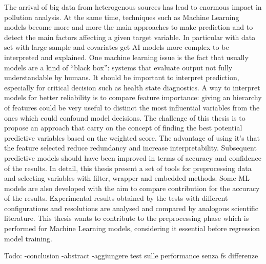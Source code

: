 The arrival of big data from heterogenous sources has lead to enormous impact in pollution analysis.
At the same time, techniques such as Machine Learning models become more and more the main approaches to make prediction and to detect the main factors affecting a given target variable.
In particular with data set with large sample and covariates get AI models more complex to be interpreted and explained.
One machine learning issue is the fact that usually models are a kind of “black box”: systems that evaluate output not fully understandable by humans. 
It should be important to interpret prediction, especially for critical decision such as health state diagnostics.
A way to interpret models for better reliability is to compare feature importance: giving an hierarchy of features could be very useful to distinct the most influential variables from the ones which could confound model decisions.
The challenge of this thesis is to propose an approach that carry on the concept of finding the best potential predictive variables based on the weighted score.
The advantage of using it's that the feature selected reduce redundancy and increase interpretability. 
Subsequent predictive models should have been improved in terms of accuracy and confidence of the results.
In detail, this thesis present a set of tools for preprocessing data and selecting variables with filter, wrapper and embedded methods.
Some ML models are also developed with the aim to compare contribution for the accuracy of the results.
Experimental results obtained by the tests with different configurations and resolutions are analysed and compared by analogous scientific literature.
This thesis wants to contribute to the preprocessing phase which is performed for Machine Learning models, considering it essential before regression model training.

Todo:
-conclusion 
-abstract
-aggiungere test sulle performance senza fs differenze
